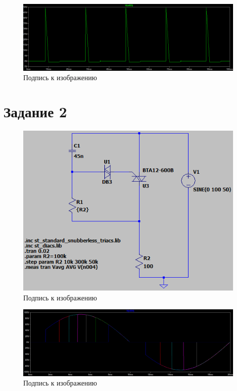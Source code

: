 \documentclass[a4paper, 12pt]{article}
\begin{document}
    \begin{figure}[H]
        \centering
        \includegraphics[scale=0.45]{a150_L20m_D.png}
        \captionsetup{skip=0pt}
        \caption{Подпись к изображению}
        \label{fig:a150_L20m_D}
    \end{figure}


    \section{Задание 2}
    \begin{figure}[H]
        \centering
        \includegraphics[scale=0.5]{scheme4.png}
        \captionsetup{skip=0pt}
        \caption{Подпись к изображению}
        \label{fig:scheme4}
    \end{figure}


    \begin{figure}[H]
        \centering
        \includegraphics[scale=0.45]{R2.png}
        \captionsetup{skip=0pt}
        \caption{Подпись к изображению}
        \label{fig:R2}
    \end{figure}
\end{document}

